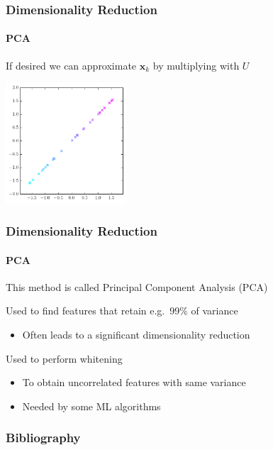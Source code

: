 \documentclass[xetex,professionalfont]{beamer}
\renewcommand{\vec}[1]{\ensuremath{\mathbf{#1}}}
\newcommand{\vx}{\vec{x}}
\let\oldemph\emph
\renewcommand\emph[1]{\textcolor{tuwcvl_inf_red}{#1}}
\begin{document}

\begin{frame}
\frametitle{Dimensionality Reduction}
\framesubtitle{PCA}

If desired we can approximate $\vx_k$ by multiplying with $U$  %

\begin{center}
\includegraphics[width=4.5cm]{figures/pca-reconstructed.pdf}
\end{center}

\end{frame}


\begin{frame}
\frametitle{Dimensionality Reduction}
\framesubtitle{PCA}

This method is called \emph{Principal Component Analysis} (\emph{PCA})

\bigskip
Used to find features that retain e.g.\ 99\% of variance
\begin{itemize}
    \item Often leads to a significant dimensionality reduction
\end{itemize}

\bigskip
Used to perform \emph{whitening} %
\begin{itemize}
    \item To obtain uncorrelated features with same variance %
    \item Needed by some ML algorithms
\end{itemize}

\end{frame}


\renewcommand\emph[1]{\oldemph{#1}}

\begin{frame}
\frametitle{Bibliography}

\printbibliography

\end{frame}
\end{document}
